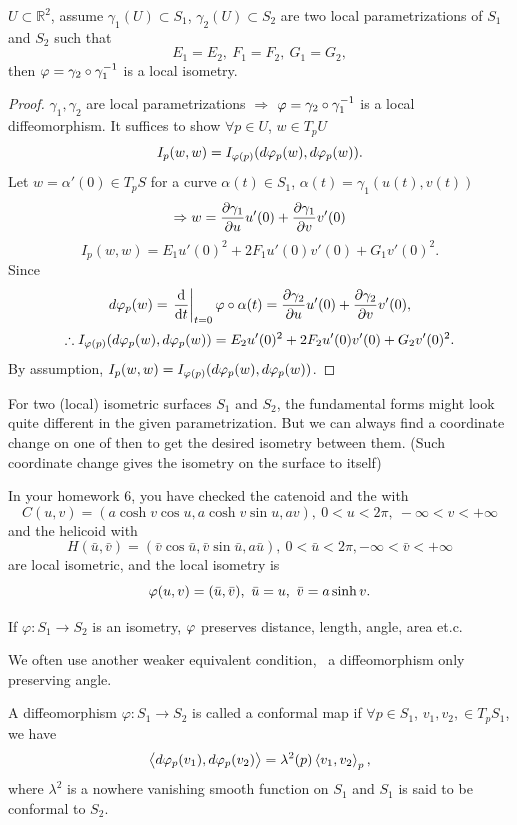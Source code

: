 \begin{proposition}
    \(U\subset \mathbb{R}^2\), assume \(\gamma_1(U)\subset S_1\), 
    \(\gamma_2(U)\subset S_2\) are two local parametrizations 
    of \(S_1\) and \(S_2\) such that 
    \[
        E_1=E_2,~F_1=F_2,~G_1=G_2,    
    \]
    then \(\varphi=\gamma_2\circ \gamma_1^{-1}\) is a local isometry.
\end{proposition}
\begin{proof}
    \(\gamma_1,\gamma_2\) are local parametrizations \(\Rightarrow\)
    \(\varphi=\gamma_2\circ\gamma_1^{-1}\) is a local diffeomorphism. 
    It suffices to show \(\forall p\in U\), \(w\in T_p U\)
    \[
        I_p(w,w)=I_{\varphi(p)}(d\varphi_p(w),d\varphi_p(w)).    
    \]
    Let \(w=\alpha'(0)\in T_p S\) for a curve \(\alpha(t)\in S_1\),
     \(\alpha(t)=\gamma_1\left(u(t),v(t)\right)\) 
     \[\Rightarrow
     w=\pdv{\gamma_1}{u}u'(0)+\pdv{\gamma_1}{v}v'(0)\]
     \[
        I_p(w,w)=E_1u'(0)^2+2 F_1u'(0)v'(0)+G_1 v'(0)^2.   
     \]
     Since
     \[
        d\varphi_p(w)=\left.\dv{t}\right|_{t=0}\varphi\circ \alpha(t)
        =\pdv{\gamma_2}{u}u'(0)+\pdv{\gamma_2}{v}v'(0) ,
     \]
     \[
        \therefore I_{\varphi(p)}(d\varphi_p(w),d\varphi_p(w))=
        E_2 u'(0)^2+2 F_2 u'(0)v'(0)+G_2 v'(0)^2  .
     \]
    By assumption, \(I_p(w,w)=I_{\varphi(p)}(d\varphi_p(w),d\varphi_p(w))\).
\end{proof}
\begin{remark}
    For two (local) isometric surfaces \(S_1\) and \(S_2\), the 
     fundamental forms might look quite different 
    in the given parametrization. But we can always find a coordinate 
    change on one of then to get the desired isometry between them.
    (Such coordinate change gives the isometry on the surface to itself)
\end{remark}
\begin{exercise}
    In your homework 6, you have checked the catenoid and the with 
    \[
        C(u,v)=\left(a\cosh v\cos u,a\cosh v\sin u,a v\right),~
        0<u<2\pi,~-\infty<v<+\infty
    \]
    and the helicoid with 
    \[
        H(\bar{u},\bar{v})=\left(\bar{v}\cos\bar{u},
        \bar{v}\sin\bar{u},a \bar{u}\right),~0<\bar{u}<2\pi,-\infty<
        \bar{v}<+\infty
    \]
    are local isometric, and the local isometry is 
    \[
        \varphi(u,v)=(\bar{u},\bar{v}),~\bar{u}=u,~\bar{v}=a\sinh v.    
    \]
\end{exercise}
\begin{remark}
    If \(\varphi\colon S_1\to S_2\) is an isometry, \(\varphi\) preserves distance, 
    length, angle, area et.c.
\end{remark}
We often use another weaker equivalent condition, \ie\ a diffeomorphism 
only preserving angle.
\begin{definition}
    A diffeomorphism \(\varphi\colon S_1\to S_2\) is called a conformal
    map if \(\forall p \in S_1\), \(v_1, v_2, \in T_p S_1\), we 
    have 
    \[
        \left\langle d\varphi_p(v_1),d\varphi_p(v_2)\right\rangle=
        \lambda^2(p)\left\langle v_1,v_2\right\rangle_p,
    \]
    where \(\lambda^2\) is a nowhere vanishing smooth function on \(S_1\)
    and \(S_1\) is said to be conformal to \(S_2\).
\end{definition}